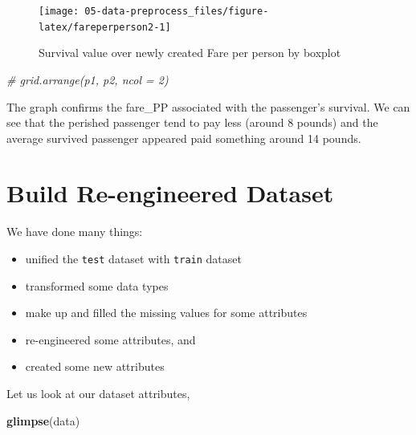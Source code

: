 \documentclass[
]{book}
\newenvironment{Shaded}{\begin{snugshade}}{\end{snugshade}}
\newcommand{\CommentTok}[1]{\textcolor[rgb]{0.56,0.35,0.01}{\textit{#1}}}
\newcommand{\KeywordTok}[1]{\textcolor[rgb]{0.13,0.29,0.53}{\textbf{#1}}}
\newcommand{\NormalTok}[1]{#1}
\providecommand{\tightlist}{%
  \setlength{\itemsep}{0pt}\setlength{\parskip}{0pt}}
\begin{document}
\begin{figure}

{\centering \texttt{[image: 05-data-preprocess\_files/figure-latex/fareperperson2-1]} 

}

\caption{Survival value over newly created Fare per person by boxplot}\label{fig:fareperperson2}
\end{figure}

\begin{Shaded}
\begin{Highlighting}[]
\CommentTok{# grid.arrange(p1, p2, ncol = 2)}
\end{Highlighting}
\end{Shaded}

The graph confirms the fare\_PP associated with the passenger's survival. We can see that the perished passenger tend to pay less (around 8 pounds) and the average survived passenger appeared paid something around 14 pounds.

\hypertarget{build-re-engineered-dataset}{%
\section{Build Re-engineered Dataset}\label{build-re-engineered-dataset}}

We have done many things:

\begin{itemize}
\tightlist
\item
  unified the \texttt{test} dataset with \texttt{train} dataset
\item
  transformed some data types
\item
  make up and filled the missing values for some attributes
\item
  re-engineered some attributes, and
\item
  created some new attributes
\end{itemize}

Let us look at our dataset attributes,

\begin{Shaded}
\begin{Highlighting}[]
\KeywordTok{glimpse}\NormalTok{(data)}
\end{Highlighting}
\end{Shaded}
\end{document}
